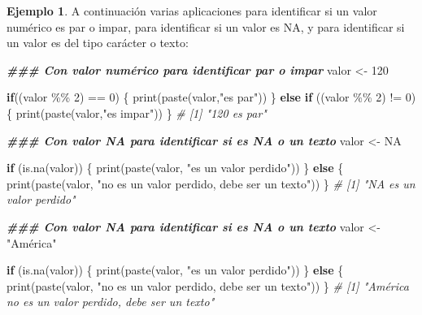 \documentclass[
]{article}
\newenvironment{Shaded}{\begin{snugshade}}{\end{snugshade}}
\newcommand{\CommentTok}[1]{\textcolor[rgb]{0.56,0.35,0.01}{\textit{#1}}}
\newcommand{\ConstantTok}[1]{\textcolor[rgb]{0.00,0.00,0.00}{#1}}
\newcommand{\ControlFlowTok}[1]{\textcolor[rgb]{0.13,0.29,0.53}{\textbf{#1}}}
\newcommand{\DecValTok}[1]{\textcolor[rgb]{0.00,0.00,0.81}{#1}}
\newcommand{\DocumentationTok}[1]{\textcolor[rgb]{0.56,0.35,0.01}{\textbf{\textit{#1}}}}
\newcommand{\FunctionTok}[1]{\textcolor[rgb]{0.00,0.00,0.00}{#1}}
\newcommand{\NormalTok}[1]{#1}
\newcommand{\OtherTok}[1]{\textcolor[rgb]{0.56,0.35,0.01}{#1}}
\newcommand{\SpecialCharTok}[1]{\textcolor[rgb]{0.00,0.00,0.00}{#1}}
\newcommand{\StringTok}[1]{\textcolor[rgb]{0.31,0.60,0.02}{#1}}
\theoremstyle{definition}
\theoremstyle{definition}
\newtheorem{example}{Ejemplo}[section]
\theoremstyle{definition}
\theoremstyle{definition}
\theoremstyle{remark}
\begin{document}
\begin{example}

A continuación varias aplicaciones para identificar si un valor numérico es par o impar, para identificar si un valor es NA, y para identificar si un valor es del tipo carácter o texto:

\begin{Shaded}
\begin{Highlighting}[]
\DocumentationTok{\#\#\# Con valor numérico para identificar par o impar}
\NormalTok{valor }\OtherTok{\textless{}{-}} \DecValTok{120}

\ControlFlowTok{if}\NormalTok{((valor }\SpecialCharTok{\%\%} \DecValTok{2}\NormalTok{) }\SpecialCharTok{==} \DecValTok{0}\NormalTok{) \{}
  \FunctionTok{print}\NormalTok{(}\FunctionTok{paste}\NormalTok{(valor,}\StringTok{"es par"}\NormalTok{))}
\NormalTok{  \} }\ControlFlowTok{else} \ControlFlowTok{if}\NormalTok{ ((valor }\SpecialCharTok{\%\%} \DecValTok{2}\NormalTok{) }\SpecialCharTok{!=} \DecValTok{0}\NormalTok{) \{}
    \FunctionTok{print}\NormalTok{(}\FunctionTok{paste}\NormalTok{(valor,}\StringTok{"es impar"}\NormalTok{)) }
\NormalTok{    \}}
\CommentTok{\# [1] "120 es par"}

\DocumentationTok{\#\#\# Con valor NA para identificar si es NA o un texto}
\NormalTok{valor }\OtherTok{\textless{}{-}} \ConstantTok{NA}

\ControlFlowTok{if}\NormalTok{ (}\FunctionTok{is.na}\NormalTok{(valor)) \{}
      \FunctionTok{print}\NormalTok{(}\FunctionTok{paste}\NormalTok{(valor, }\StringTok{"es un valor perdido"}\NormalTok{))}
\NormalTok{    \} }\ControlFlowTok{else}\NormalTok{ \{}
      \FunctionTok{print}\NormalTok{(}\FunctionTok{paste}\NormalTok{(valor, }\StringTok{"no es un valor perdido, debe ser un texto"}\NormalTok{))}
\NormalTok{    \}}
\CommentTok{\# [1] "NA es un valor perdido"}

\DocumentationTok{\#\#\# Con valor NA para identificar si es NA o un texto}
\NormalTok{valor }\OtherTok{\textless{}{-}} \StringTok{"América"}

\ControlFlowTok{if}\NormalTok{ (}\FunctionTok{is.na}\NormalTok{(valor)) \{}
      \FunctionTok{print}\NormalTok{(}\FunctionTok{paste}\NormalTok{(valor, }\StringTok{"es un valor perdido"}\NormalTok{))}
\NormalTok{    \} }\ControlFlowTok{else}\NormalTok{ \{}
      \FunctionTok{print}\NormalTok{(}\FunctionTok{paste}\NormalTok{(valor, }\StringTok{"no es un valor perdido, debe ser un texto"}\NormalTok{))}
\NormalTok{    \}}
\CommentTok{\# [1] "América no es un valor perdido, debe ser un texto"}
\end{Highlighting}
\end{Shaded}

\end{example}
\end{document}
